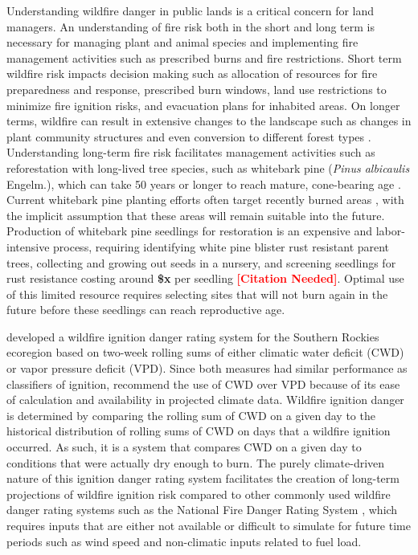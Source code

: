 \documentclass[11pt]{article}
\newcommand{\citethis}{\textbf{\textcolor{red}{[Citation Needed]}}}
\begin{document}
Understanding wildfire danger in public lands is a critical concern for land managers.  An understanding of fire risk both in the short and long term is necessary for managing plant and animal species and implementing fire management activities such as prescribed burns and fire restrictions. Short term wildfire risk impacts decision making such as allocation of resources for fire preparedness and response, prescribed burn windows, land use restrictions to minimize fire ignition risks, and evacuation plans for inhabited areas.  On longer terms, wildfire can result in extensive changes to the landscape such as changes in plant community structures and even conversion to different forest types \citep{coopWildfireDrivenForestConversion2020}. Understanding long-term fire risk facilitates management activities such as reforestation with long-lived tree species, such as whitebark pine (\textit{Pinus albicaulis} Engelm.), which can take 50 years or longer to reach mature, cone-bearing age \citep{tombackWhitebarkPineCommunities2001}. Current whitebark pine planting efforts often target recently burned areas \citep{keaneRangewideRestorationStrategy2012}, with the implicit assumption that these areas will remain suitable into the future. Production of whitebark pine seedlings for restoration is an expensive and labor-intensive process, requiring identifying white pine blister rust resistant parent trees, collecting and growing out seeds in a nursery, and screening seedlings for rust resistance costing around \textbf{\$x} per seedling \citethis.  Optimal use of this limited resource requires selecting sites that will not burn again in the future before these seedlings can reach reproductive age. 

\citet{thomaWaterBalanceIndicator2020} developed a wildfire ignition danger rating system for the Southern Rockies ecoregion \citep{omernikEcoregionsConterminousUnited1987} based on two-week rolling sums of either climatic water deficit (CWD) or vapor pressure deficit (VPD). Since both measures had similar performance as classifiers of ignition, \citet{thomaWaterBalanceIndicator2020} recommend the use of CWD over VPD because of its ease of calculation and availability in projected climate data.  Wildfire ignition danger is determined by comparing the rolling sum of CWD on a given day to the historical distribution of rolling sums of CWD on days that a wildfire ignition occurred. As such, it is a system that compares CWD on a given day to conditions that were actually dry enough to burn. The purely climate-driven nature of this ignition danger rating system facilitates the creation of long-term projections of wildfire ignition risk compared to other commonly used wildfire danger rating systems such as the National Fire Danger Rating System \citep{degrootChapter11Wildland2015}, which requires inputs that are either not available or difficult to simulate for future time periods such as wind speed and non-climatic inputs related to fuel load.  
\end{document}
